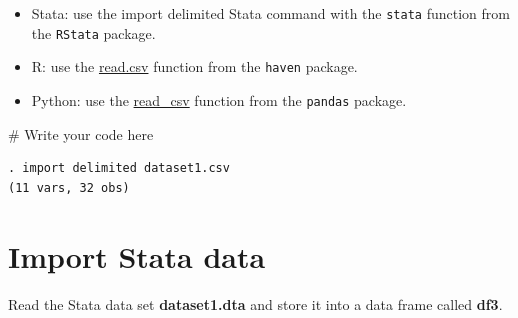 \documentclass[
  letterpaper,
  DIV=11,
  numbers=noendperiod]{scrreprt}
\newenvironment{Shaded}{\begin{snugshade}}{\end{snugshade}}
\newcommand{\CommentTok}[1]{\textcolor[rgb]{0.37,0.37,0.37}{#1}}
\providecommand{\tightlist}{%
  \setlength{\itemsep}{0pt}\setlength{\parskip}{0pt}}\usepackage{longtable,booktabs,array}
\begin{document}
\begin{tcolorbox}[enhanced jigsaw, left=2mm, colback=white, coltitle=black, toptitle=1mm, bottomrule=.15mm, rightrule=.15mm, leftrule=.75mm, bottomtitle=1mm, colbacktitle=quarto-callout-tip-color!10!white, opacityback=0, arc=.35mm, colframe=quarto-callout-tip-color-frame, titlerule=0mm, title=\textcolor{quarto-callout-tip-color}{\faLightbulb}\hspace{0.5em}{Tip}, breakable, toprule=.15mm, opacitybacktitle=0.6]

\begin{itemize}
\tightlist
\item
  Stata: use the import delimited Stata command with the \texttt{stata}
  function from the \texttt{RStata} package.
\item
  R: use the
  \href{https://www.rdocumentation.org/packages/utils/versions/3.6.2/topics/read.table}{read.csv}
  function from the \texttt{haven} package.
\item
  Python: use the
  \href{https://pandas.pydata.org/docs/reference/api/pandas.read_csv.html}{read\_csv}
  function from the \texttt{pandas} package.
\end{itemize}

\end{tcolorbox}

\begin{Shaded}
\begin{Highlighting}[]
\CommentTok{\# Write your code here}
\end{Highlighting}
\end{Shaded}

\begin{verbatim}
. import delimited dataset1.csv
(11 vars, 32 obs)
\end{verbatim}

\hypertarget{import-stata-data}{%
\section{Import Stata data}\label{import-stata-data}}

Read the Stata data set \textbf{dataset1.dta} and store it into a data
frame called \textbf{df3}.
\end{document}
